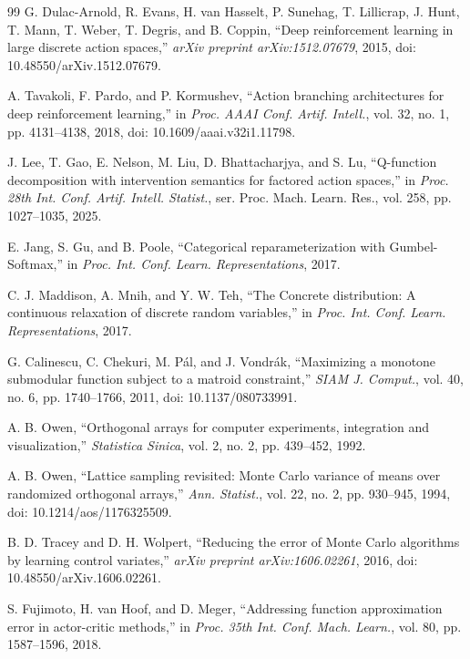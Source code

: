 \documentclass[10pt,journal]{IEEEtran}
\begin{document}
\begin{thebibliography}{99}
G. Dulac-Arnold, R. Evans, H. van Hasselt, P. Sunehag,
T. Lillicrap, J. Hunt, T. Mann, T. Weber, T. Degris,
and B. Coppin,
``Deep reinforcement learning in large discrete action spaces,''
\emph{arXiv preprint arXiv:1512.07679}, 2015,
doi: 10.48550/arXiv.1512.07679.

A. Tavakoli, F. Pardo, and P. Kormushev,
``Action branching architectures for deep reinforcement learning,''
in \emph{Proc. AAAI Conf. Artif. Intell.},
vol. 32, no. 1, pp. 4131--4138, 2018,
doi: 10.1609/aaai.v32i1.11798.

J. Lee, T. Gao, E. Nelson, M. Liu, D. Bhattacharjya,
and S. Lu,
``Q-function decomposition with intervention semantics
for factored action spaces,''
in \emph{Proc. 28th Int. Conf. Artif. Intell. Statist.},
ser. Proc. Mach. Learn. Res., vol. 258, pp. 1027--1035, 2025.

E. Jang, S. Gu, and B. Poole,
``Categorical reparameterization with Gumbel-Softmax,''
in \emph{Proc. Int. Conf. Learn. Representations}, 2017.

C. J. Maddison, A. Mnih, and Y. W. Teh,
``The Concrete distribution:
A continuous relaxation of discrete random variables,''
in \emph{Proc. Int. Conf. Learn. Representations}, 2017.

G. Calinescu, C. Chekuri, M. P{\'a}l, and J. Vondr{\'a}k,
``Maximizing a monotone submodular function subject to
a matroid constraint,''
\emph{SIAM J. Comput.},
vol. 40, no. 6, pp. 1740--1766, 2011,
doi: 10.1137/080733991.

A. B. Owen,
``Orthogonal arrays for computer experiments,
integration and visualization,''
\emph{Statistica Sinica},
vol. 2, no. 2, pp. 439--452, 1992.

A. B. Owen,
``Lattice sampling revisited:
Monte Carlo variance of means over randomized orthogonal arrays,''
\emph{Ann. Statist.},
vol. 22, no. 2, pp. 930--945, 1994,
doi: 10.1214/aos/1176325509.

B. D. Tracey and D. H. Wolpert,
``Reducing the error of Monte Carlo algorithms
by learning control variates,''
\emph{arXiv preprint arXiv:1606.02261}, 2016,
doi: 10.48550/arXiv.1606.02261.

S. Fujimoto, H. van Hoof, and D. Meger,
``Addressing function approximation error
in actor-critic methods,''
in \emph{Proc. 35th Int. Conf. Mach. Learn.},
vol. 80, pp. 1587--1596, 2018.

\end{thebibliography}
\end{document}
